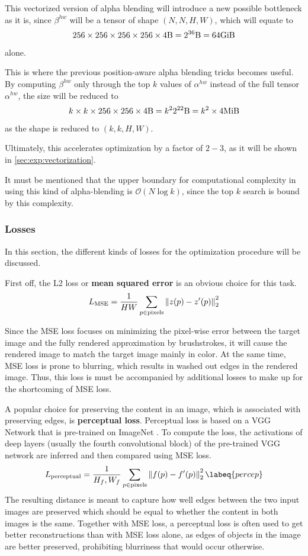 This vectorized version of alpha blending will introduce a new possible bottleneck as it is, since $\beta^{hw}$ will be a tensor of shape $(N, N, H, W)$, which will equate to
$$
256 \times 256 \times 256 \times 256 \times 4 \si{\byte} = 2^{36}\si{\byte} = 64\si{\gibi\byte}
$$
alone.

This is where the previous position-aware alpha blending tricks becomes useful.
By computing $\beta^{hw}$ only through the top $k$ values of $\alpha^{hw}$ instead of the full tensor $\alpha^{hw}$, the size will be reduced to
$$
k \times k \times 256 \times 256 \times 4 \si{\byte} = k^2 2^{22}\si{\byte} = k^2 \times 4\si{\mebi\byte}
$$
as the shape is reduced to $(k, k, H, W)$.

Ultimately, this accelerates optimization by a factor of $2-3$, as it will be shown in \ref{sec:exp:vectorization}.

It must be mentioned that the upper boundary for computational complexity in using this kind of alpha-blending is $\mathcal{O}(N \log k)$, since the top $k$ search is bound by this complexity.

\subsubsection{Losses}

In this section, the different kinds of losses for the optimization procedure will be discussed.

First off, the L2 loss or \textbf{mean squared error} is an obvious choice for this task.
\begin{align}
    L_{\text{MSE}} = \frac{1}{HW} \sum_{p \in \text{pixels}} \left\lVert z(p) - z'(p)\right\rVert_2^2
\end{align}

Since the MSE loss focuses on minimizing the pixel-wise error between the target image and the fully rendered approximation by brushstrokes, it will cause the rendered image to match the target image mainly in color.
At the same time, MSE loss is prone to blurring, which results in washed out edges in the rendered image.
Thus, this loss is must be accompanied by additional losses to make up for the shortcoming of MSE loss.

A popular choice for preserving the content in an image, which is associated with preserving edges, is \textbf{perceptual loss}.
Perceptual loss is based on a VGG Network \cite{VGG} that is pre-trained on ImageNet \cite{ImageNet}.
To compute the loss, the activations of deep layers (usually the fourth convolutional block) of the pre-trained VGG network are inferred and then compared using MSE loss.
\begin{align}
    L_{\text{perceptual}} = \frac{1}{H_f, W_f} \sum_{p \in \text{pixels}} \norm{f(p) - f'(p)}_2^2
    \labeq{percep}
\end{align}
The resulting distance is meant to capture how well edges between the two input images are preserved which should be equal to whether the content in both images is the same.
Together with MSE loss, a perceptual loss is often used to get better reconstructions than with MSE loss alone, as edges of objects in the image are better preserved, prohibiting blurriness that would occur otherwise.

